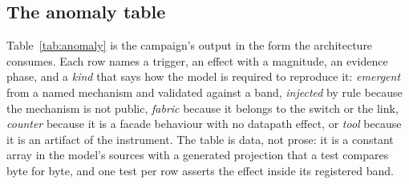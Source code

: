 \subsection{The anomaly table}

Table~\ref{tab:anomaly} is the campaign's output in the form the architecture
consumes. Each row names a trigger, an effect with a magnitude, an evidence
phase, and a \emph{kind} that says how the model is required to reproduce it:
\textit{emergent} from a named mechanism and validated against a band,
\textit{injected} by rule because the mechanism is not public,
\textit{fabric} because it belongs to the switch or the link, \textit{counter}
because it is a facade behaviour with no datapath effect, or \textit{tool}
because it is an artifact of the instrument. The table is data, not prose: it
is a constant array in the model's sources with a generated projection that a
test compares byte for byte, and one test per row asserts the effect inside its
registered band.


